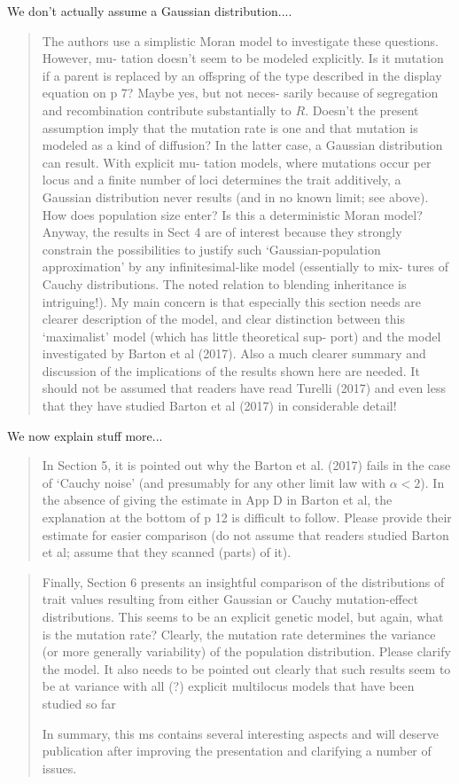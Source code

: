 We don't actually assume a Gaussian distribution....

\begin{quote}
The authors use a simplistic Moran model to investigate these questions. However, mu-
tation doesn’t seem to be modeled explicitly. Is it mutation if a parent is replaced by an
offspring of the type described in the display equation on p 7? Maybe yes, but not neces-
sarily because of segregation and recombination contribute substantially to $R$. Doesn’t the
present assumption imply that the mutation rate is one and that mutation is modeled as a
kind of diffusion? In the latter case, a Gaussian distribution can result. With explicit mu-
tation models, where mutations occur per locus and a finite number of loci determines the
trait additively, a Gaussian distribution never results (and in no known limit; see above).
How does population size enter? Is this a deterministic Moran model? Anyway, the results
in Sect 4 are of interest because they strongly constrain the possibilities to justify such
‘Gaussian-population approximation’ by any infinitesimal-like model (essentially to mix-
tures of Cauchy distributions. The noted relation to blending inheritance is intriguing!).
My main concern is that especially this section needs are clearer description of the model,
and clear distinction between this ‘maximalist’ model (which has little theoretical sup-
port) and the model investigated by Barton et al (2017). Also a much clearer summary
and discussion of the implications of the results shown here are needed. It should not be
assumed that readers have read Turelli (2017) and even less that they have studied Barton
et al (2017) in considerable detail!
\end{quote}

We now explain stuff more...

\begin{quote}
In Section 5, it is pointed out why the Barton et al. (2017) fails in the case of ‘Cauchy
noise’ (and presumably for any other limit law with $\alpha < 2$). In the absence of giving the
estimate in App D in Barton et al, the explanation at the bottom of p 12 is difficult to
follow. Please provide their estimate for easier comparison (do not assume that readers
studied Barton et al; assume that they scanned (parts) of it).
\end{quote}

\begin{quote}
Finally, Section 6 presents an insightful comparison of the distributions of trait values
resulting from either Gaussian or Cauchy mutation-effect distributions. This seems to be
an explicit genetic model, but again, what is the mutation rate? Clearly, the mutation
rate determines the variance (or more generally variability) of the population distribution.
Please clarify the model. It also needs to be pointed out clearly that such results seem to
be at variance with all (?) explicit multilocus models that have been studied so far

In summary, this ms contains several interesting aspects and will deserve publication after
improving the presentation and clarifying a number of issues.
\end{quote}


